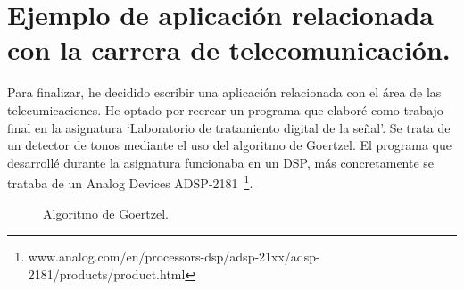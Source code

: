 \section{Ejemplo de aplicación relacionada con la carrera de telecomunicación.} %
\label{sec:Ejemplo de aplicación relacionada con la carrera de telecomunicación.}

Para finalizar, he decidido escribir una aplicación relacionada con el área de las telecumicaciones. He optado por recrear un programa que elaboré como trabajo final en la asignatura `Laboratorio de tratamiento digital de la señal'. Se trata de un detector de tonos mediante el uso del algoritmo de Goertzel. El programa que desarrollé durante la asignatura funcionaba en un DSP, más concretamente se trataba de un Analog Devices ADSP-2181~\footnote{www.analog.com/en/processors-dsp/adsp-21xx/adsp-2181/products/product.html}.
\begin{figure}[htb]
\centering
{}
\caption{Algoritmo de Goertzel.}
\label{goertzel}
\end{figure}

